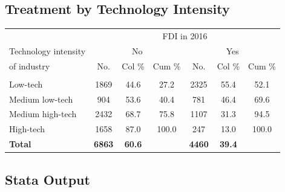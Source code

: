 \documentclass[a4paper,11pt]{scrartcl}
\begin{document}
\subsection{Treatment by Technology Intensity}
\label{app:tech}
\begin{table}[htbp]
	\centering
\begin{threeparttable}

\begin{tabular}{lcccccc} 
\hline
\hline
 & \multicolumn{6}{c}{FDI in 2016} \\
Technology intensity & \multicolumn{3}{c}{No} & \multicolumn{3}{c}{Yes} \\
of industry &No.&Col \% &Cum \% &No.&Col \% &Cum \% \\
\hline
	&  &  &  &  &  &   \\
Low-tech &1869&44.6&27.2&2325&55.4&52.1 \\
Medium low-tech &904&53.6&40.4&781&46.4&69.6 \\
Medium high-tech &2432&68.7&75.8&1107&31.3&94.5 \\
High-tech &1658&87.0&100.0&247&13.0&100.0 \\
\textbf{Total}&\textbf{6863}&\textbf{60.6}&&\textbf{4460}&\textbf{39.4}& \\
\hline
\hline
\end{tabular}

\end{threeparttable}
\end{table}

\subsection{Stata Output}
\end{document}
